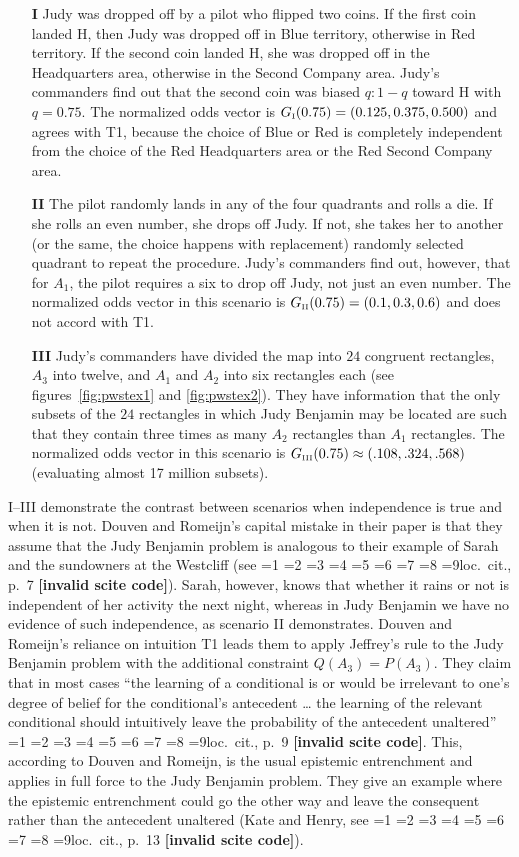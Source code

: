 \documentclass[12pt]{article}
\newcommand{\qeins}[1]{``#1''}
\newif\ifNumericalOrYear
\newcommand{\PageP}{p.~}
\newcommand{\PageP}{}
\newcommand{\scite}[3]{\ifnum#1=1\ifNumericalOrYear\citep{#2}\else\citeyearpar{#2}\fi\else
\ifnum#1=2\ifNumericalOrYear\citep[#3]{#2}\else\citep[{\PageP}#3]{#2}\fi\else
\ifnum#1=3\ifNumericalOrYear(\citet[#3]{#2})\else\citep[{\PageP}#3]{#2}\fi\else
\ifnum#1=4\ifNumericalOrYear\citet{#2}\else\citet{#2}\fi\else
\ifnum#1=5\ifNumericalOrYear(\citet{#2})\else\citep{#2}\fi\else
\ifnum#1=6\ifNumericalOrYear(\citet[#3]{#2})\else\citep[{\PageP}#3]{#2}\fi\else
\ifnum#1=7\ifNumericalOrYear\citep{#2}\else\citealp{#2}\fi\else
\ifnum#1=8\ifNumericalOrYear\citep[#3]{#2}\else\citealp[{\PageP}#3]{#2}\fi\else
\ifnum#1=9\ifNumericalOrYear\citep[#3]{#2}\else{}loc.\ cit., {\PageP}#3\fi\else
\textbf{[invalid scite code]}\fi\fi\fi\fi\fi\fi\fi\fi\fi}
\begin{document}
\begin{enumerate}
\item[\textbf{I}] Judy was dropped off by a pilot who flipped two
  coins. If the first coin landed H, then Judy was dropped off in Blue
  territory, otherwise in Red territory. If the second coin landed H,
  she was dropped off in the Headquarters area, otherwise in the
  Second Company area. Judy's commanders find out that the second coin
  was biased $q:1-q$ toward H with $q=0.75$. The normalized odds
  vector is $G_{\mbox{\tiny I}}(0.75)=(0.125,0.375,0.500)$ and agrees
  with T1, because the choice of Blue or Red is completely independent
  from the choice of the Red Headquarters area or the Red Second
  Company area.
\item[\textbf{II}] The pilot randomly lands in any of the four
  quadrants and rolls a die. If she rolls an even number, she drops
  off Judy. If not, she takes her to another (or the same, the choice
  happens with replacement) randomly selected quadrant to repeat the
  procedure. Judy's commanders find out, however, that for $A_{1}$,
  the pilot requires a six to drop off Judy, not just an even number.
  The normalized odds vector in this scenario is $G_{\mbox{\tiny
      II}}(0.75)=(0.1,0.3,0.6)$ and does not accord with T1.
\item[\textbf{III}] Judy's commanders have divided the map into $24$
  congruent rectangles, $A_{3}$ into twelve, and $A_{1}$ and $A_{2}$
  into six rectangles each (see figures~\ref{fig:pwstex1} and
  \ref{fig:pwstex2}). They have information that the only subsets of
  the $24$ rectangles in which Judy Benjamin may be located are such
  that they contain three times as many $A_{2}$ rectangles than
  $A_{1}$ rectangles. The normalized odds vector in this scenario is
  $G_{\mbox{\tiny III}}(0.75)\approx(.108,.324,.568)$ (evaluating almost
  17 million subsets).
\end{enumerate}

I--III demonstrate the contrast between scenarios when independence is
true and when it is not. Douven and Romeijn's capital mistake in their
paper is that they assume that the Judy Benjamin problem is analogous
to their example of Sarah and the sundowners at the Westcliff (see
\scite{8}{douvenromeijn09}{7}). Sarah, however, knows that whether it
rains or not is independent of her activity the next night, whereas in
Judy Benjamin we have no evidence of such independence, as scenario II
demonstrates. Douven and Romeijn's reliance on intuition T1 leads them
to apply Jeffrey's rule to the Judy Benjamin problem with the
additional constraint $Q(A_{3})=P(A_{3})$. They claim that in most
cases \qeins{the learning of a conditional is or would be irrelevant
  to one's degree of belief for the conditional's antecedent {\ldots}
  the learning of the relevant conditional should intuitively leave
  the probability of the antecedent unaltered}
\scite{2}{douvenromeijn09}{9}. This, according to Douven and Romeijn,
is the usual epistemic entrenchment and applies in full force to the
Judy Benjamin problem. They give an example where the epistemic
entrenchment could go the other way and leave the consequent rather
than the antecedent unaltered (Kate and Henry, see
\scite{8}{douvenromeijn09}{13}). 
\end{document}
